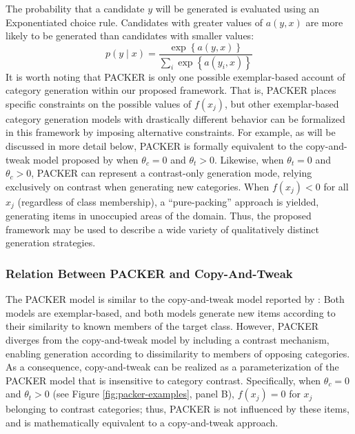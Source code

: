 \documentclass[12pt]{article}
\begin{document}
\begin{flushleft}
The probability that a candidate $y$ will be generated is evaluated using an
Exponentiated \citet{luce1977choice} choice rule. Candidates with greater values
of $a(y,x)$ are more likely to be generated than candidates with smaller values:
% 
\begin{equation} p(y \mid x) = \dfrac { \exp \left \{ a \left( y, x
\right) \right \} } { \sum_i{ \exp \left \{ a \left( y_i, x \right)
\right\} } }
\label{eq:packer-choice}
\end{equation}
% 
It is worth noting that PACKER is only one possible exemplar-based account of
category generation within our proposed framework. That is, PACKER places
specific constraints on the possible values of $f(x_j)$, but other
exemplar-based category generation models with drastically different behavior
can be formalized in this framework by imposing alternative constraints. For
example, as will be discussed in more detail below, PACKER is formally
equivalent to the copy-and-tweak model proposed by \cite{jern2013probabilistic}
when $\theta_c = 0$ and $\theta_t > 0$. Likewise, when
$\theta_t = 0$ and $\theta_c > 0$, PACKER can represent a
contrast-only generation mode, relying exclusively on contrast when generating
new categories. When $f(x_j) < 0$ for all $x_j$ (regardless of class
membership), a ``pure-packing'' approach is yielded, generating items in
unoccupied areas of the domain. Thus, the proposed framework may be used to
describe a wide variety of qualitatively distinct generation strategies.

\subsubsection{Relation Between PACKER and Copy-And-Tweak}
\label{section:copytweak-packer} The PACKER model is similar to the
copy-and-tweak model reported by \cite{jern2013probabilistic}: Both models are
exemplar-based, and both models generate new items according to their similarity
to known members of the target class. However, PACKER diverges from the
copy-and-tweak model by including a contrast mechanism, enabling generation
according to dissimilarity to members of opposing categories. As a consequence,
copy-and-tweak can be realized as a parameterization of the PACKER model that is
insensitive to category contrast. Specifically, when $\theta_c = 0$ and
$\theta_t > 0$ (see Figure \ref{fig:packer-examples}, panel B), $f(x_j) = 0$ for
$x_j$ belonging to contrast categories; thus, PACKER is not influenced by these
items, and is mathematically equivalent to a copy-and-tweak approach.


\end{flushleft}
\end{document}
